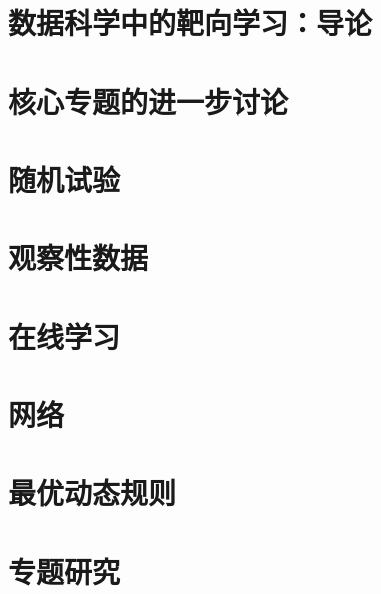 \documentclass[UTF8,11pt,openany,fontset=windows]{ctexbook}
\begin{document}
\frontmatter




\tableofcontents


\mainmatter
\part{数据科学中的靶向学习：导论}




\part{核心专题的进一步讨论}






\part{随机试验}



\part{观察性数据}




\part{在线学习}


\part{网络}


\part{最优动态规则}



\part{专题研究}






\appendix
{}

\backmatter

\end{document}
